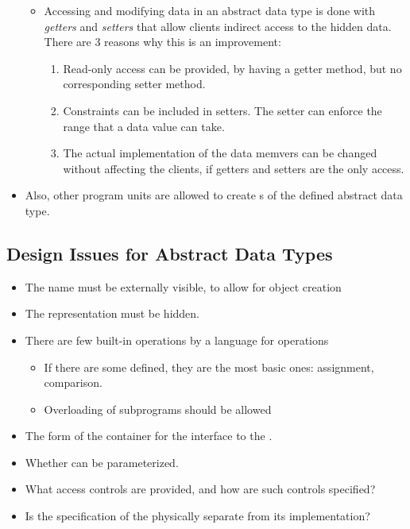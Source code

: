 \begin{definition}
\begin{itemize}[noitemsep]
\begin{itemize}[noitemsep]
    \item Accessing and modifying data in an abstract data type is done with \emph{getters} and \emph{setters} that allow clients indirect access to the hidden data. There are 3 reasons why this is an improvement:
      \begin{enumerate}[noitemsep]
      \item Read-only access can be provided, by having a getter method, but no corresponding setter method.
      \item Constraints can be included in setters. The setter can enforce the range that a data value can take.
      \item The actual implementation of the data memvers can be changed without affecting the clients, if getters and setters are the only access.
      \end{enumerate}
    \end{itemize}
  \item Also, other program units are allowed to create s of the defined abstract data type.
  \end{itemize}
\end{definition}


\subsection{Design Issues for Abstract Data Types}\label{subsec:Abstract_Data_Type_Design_Issues}
\begin{itemize}[noitemsep]
\item The  name must be externally visible, to allow for object creation
\item The  representation must be hidden.
\item There are few built-in operations by a language for  operations
  \begin{itemize}[noitemsep]
  \item If there are some defined, they are the most basic ones: assignment, comparison.
  \item Overloading of subprograms should be allowed
  \end{itemize}
\item The form of the container for the interface to the .
\item Whether  can be parameterized.
\item What access controls are provided, and how are such controls specified?
\item Is the specification of the  physically separate from its implementation?
\end{itemize}


